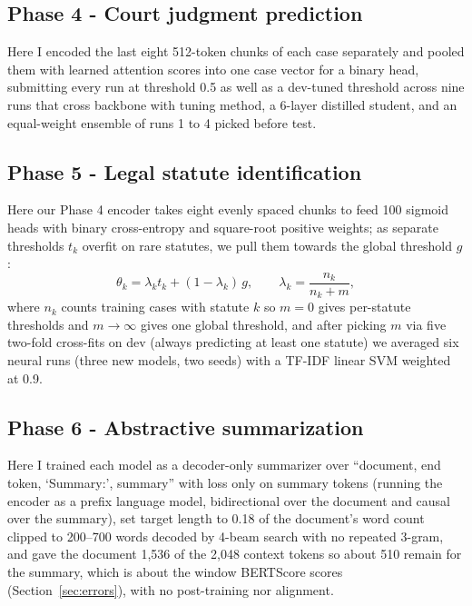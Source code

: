 \documentclass[11pt, oneside]{article}
\begin{document}
\subsection{Phase 4 - Court judgment prediction}
Here I encoded the last eight 512-token chunks of each case separately and pooled them with learned attention scores into one case vector for a binary head, submitting every run at threshold 0.5 as well as a dev-tuned threshold across nine runs that cross backbone with tuning method, a 6-layer distilled student, and an equal-weight ensemble of runs 1 to 4 picked before test.

\subsection{Phase 5 - Legal statute identification}
Here our Phase 4 encoder takes eight evenly spaced chunks to feed 100 sigmoid heads with binary cross-entropy and square-root positive weights; as separate thresholds $t_k$ overfit on rare statutes, we pull them towards the global threshold $g$:
\begin{equation}
\theta_k = \lambda_k t_k + (1-\lambda_k)\, g, \qquad \lambda_k = \frac{n_k}{n_k+m},
\end{equation}
where $n_k$ counts training cases with statute $k$ so $m=0$ gives per-statute thresholds and $m\to\infty$ gives one global threshold, and after picking $m$ via five two-fold cross-fits on dev (always predicting at least one statute) we averaged six neural runs (three new models, two seeds) with a TF-IDF linear SVM weighted at 0.9.

\subsection{Phase 6 - Abstractive summarization}
Here I trained each model as a decoder-only summarizer over ``document, end token, `Summary:', summary'' with loss only on summary tokens (running the encoder as a prefix language model, bidirectional over the document and causal over the summary), set target length to 0.18 of the document's word count clipped to 200--700 words decoded by 4-beam search with no repeated 3-gram, and gave the document 1,536 of the 2,048 context tokens so about 510 remain for the summary, which is about the window BERTScore scores (Section~\ref{sec:errors}), with no post-training nor alignment.
\end{document}
